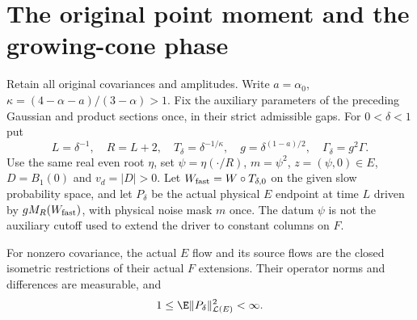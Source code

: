 \section{The original point moment and the growing-cone phase}
\label{S:original-point-transfer}

Retain all original covariances and amplitudes.
Write $a=\alpha_0$, $\kappa=(4-\alpha-a)/(3-\alpha)>1$.
Fix the auxiliary parameters of the preceding Gaussian and product
sections once, in their strict admissible gaps.
For $0<\delta<1$ put
\[
  L=\delta^{-1},\quad R=L+2,\quad T_\delta=\delta^{-1/\kappa},
  \quad g=\delta^{(1-a)/2},\quad \Gamma_\delta=g^2\Gamma .
\]
Use the same real even root $\eta$, set $\psi=\eta(\cdot/R)$,
$m=\psi^2$, $z=(\psi,0)\in E$, $D=B_1(0)$ and $v_d=|D|>0$.
Let $W_{\rm fast}=W\circ T_{\delta,0}$ on the given slow probability
space, and let $P_\delta$ be the actual physical $E$ endpoint at time
$L$ driven by $gM_R(W_{\rm fast})$, with physical noise mask $m$ once.
The datum $\psi$ is not the auxiliary cutoff used to extend the driver
to constant columns on $F$.

\begin{lemma}
  \label{L:point-actual-finiteness}
  For nonzero covariance, the actual $E$ flow and its source flows
  are the closed isometric restrictions of their actual $F$ extensions.
  Their operator norms and differences are measurable, and
  \begin{equation}\label{E:point-fixed-finiteness}
    1\le\E\|P_\delta\|_{\mathcal L(E)}^2<\infty .
  \end{equation}
\end{lemma}

